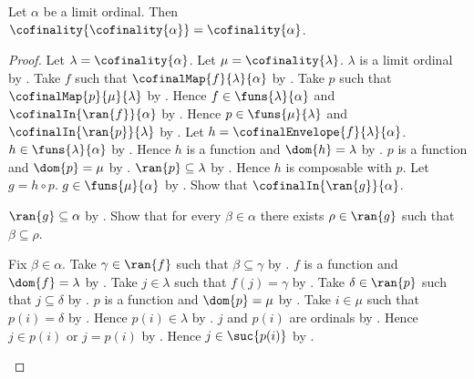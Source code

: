 \begin{theorem}\label{cofinality_of_cofinality}
    Let $\alpha$ be a limit ordinal.
    Then $\cofinality{\cofinality{\alpha}}=\cofinality{\alpha}$.
\end{theorem}
\begin{proof}
    Let $\lambda=\cofinality{\alpha}$.
    Let $\mu=\cofinality{\lambda}$.
    $\lambda$ is a limit ordinal
        by .
    Take $f$ such that $\cofinalMap{f}{\lambda}{\alpha}$
        by .
    Take $p$ such that $\cofinalMap{p}{\mu}{\lambda}$
        by .
    Hence $f\in\funs{\lambda}{\alpha}$ and
        $\cofinalIn{\ran{f}}{\alpha}$ by .
    Hence $p\in\funs{\mu}{\lambda}$ and
        $\cofinalIn{\ran{p}}{\lambda}$ by .
    Let $h=\cofinalEnvelope{f}{\lambda}{\alpha}$.
    $h\in\funs{\lambda}{\alpha}$
        by .
    Hence $h$ is a function and $\dom{h}=\lambda$
        by .
    $p$ is a function and $\dom{p}=\mu$
        by .
    $\ran{p}\subseteq\lambda$ by .
    Hence $h$ is composable with $p$.
    Let $g=h\circ p$.
    $g\in\funs{\mu}{\alpha}$ by .
    Show that $\cofinalIn{\ran{g}}{\alpha}$.
    \begin{subproof}
        $\ran{g}\subseteq\alpha$ by .
        Show that for every $\beta\in\alpha$ there exists
            $\rho\in\ran{g}$ such that $\beta\subseteq\rho$.
        \begin{subproof}
            Fix $\beta\in\alpha$.
            Take $\gamma\in\ran{f}$ such that $\beta\subseteq\gamma$
                by .
            $f$ is a function and $\dom{f}=\lambda$
                by .
            Take $j\in\lambda$ such that $f(j)=\gamma$
                by .
            Take $\delta\in\ran{p}$ such that $j\subseteq\delta$
                by .
            $p$ is a function and $\dom{p}=\mu$
                by .
            Take $i\in\mu$ such that $p(i)=\delta$
                by .
            Hence $p(i)\in\lambda$ by .
            $j$ and $p(i)$ are ordinals
                by .
            Hence $j\in p(i)$ or $j=p(i)$
                by .
            Hence $j\in\suc{p(i)}$ by .

\end{subproof}
\end{subproof}
\end{proof}
